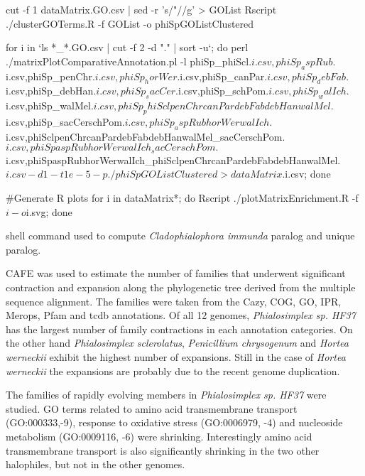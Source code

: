 \documentclass[fontsize=10pt, paper=a4,fleqn, ]{wlscirep}
\newif\ifcode
\newcommand{\TODO}[1]{\textbf{\color{red}{#1}}}
\newcommand{\claImm}{\textit{Cladophialophora immunda}}
\newcommand{\horWer}{\textit{Hortea werneckii}}
\newcommand{\penChr}{\textit{Penicillium chrysogenum}}
\newcommand{\phiSp}{\textit{Phialosimplex sp. HF37}}
\newcommand{\phiScl}{\textit{Phialosimplex sclerolatus}}
\begin{document}
\begin{listing}
{    cut -f 1 dataMatrix.GO.csv | sed -r 's/"//g' > GOList
    Rscript ./clusterGOTerms.R -f GOList -o phiSpGOListClustered

    for i in `ls *_*.GO.csv | cut -f 2 -d "." | sort -u`; do  perl
    ./matrixPlotComparativeAnnotation.pl -l
    phiSp_phiScl.$i.csv,phiSp_aspRub.$i.csv,phiSp_penChr.$i.csv,phiSp_horWer.$i.csv,phiSp_canPar.$i.csv,phiSp_debFab.$i.csv,phiSp_debHan.$i.csv,phiSp_sacCer.$i.csv,phiSp_schPom.$i.csv,phiSp_walIch.$i.csv,phiSp_walMel.$i.csv,phiSp_phiSclpenChrcanPardebFabdebHanwalMel.$i.csv,phiSp_sacCerschPom.$i.csv,phiSp_aspRubhorWerwalIch.$i.csv,phiSclpenChrcanPardebFabdebHanwalMel_sacCerschPom.$i.csv,phiSpaspRubhorWerwalIch_sacCerschPom.$i.csv,phiSpaspRubhorWerwalIch_phiSclpenChrcanPardebFabdebHanwalMel.$i.csv
    -d 1 -t 1e-5 -p ./phiSpGOListClustered > dataMatrix.$i.csv; done 
    
    #Generate R plots
    for i in dataMatrix*; do Rscript ./plotMatrixEnrichment.R -f $i -o $i.svg; done
  }
  \label{code:countTotalParalog}
  \caption{shell command used to compute {\claImm} paralog and unique paralog.}
\end{listing}
\fi


\ifcode
\begin{listing}
  \mint[breaklines,bgcolor=black,formatcom=\color{white},fontsize=\footnotesize]{shell}{
    
  \label{code:AAComparison}
  \caption{Command used to generate the rooted tree}
\end{listing}
\fi

\TODO{AA analysis with correlation analysis, apply correlation
  analysis to eggnog annotation and IPR}

CAFE was used to estimate the number of families that underwent
significant contraction and expansion along the
phylogenetic tree derived from the multiple sequence alignment.
The families were taken from the Cazy, COG, GO, IPR, Merops, Pfam and
tcdb annotations. Of all 12 genomes, {\phiSp} has the largest number of family
contractions in each annotation categories. On the other hand
{\phiScl}, {\penChr} and {\horWer} exhibit the highest number of
expansions. Still in the case of {\horWer} the expansions are probably due
to the recent genome duplication. 

The families of rapidly evolving members in {\phiSp} were studied. GO
terms related to amino acid transmembrane transport (GO:000333,-9),
response to oxidative stress  (GO:0006979, -4) and nucleoside
metabolism (GO:0009116, -6) were shrinking. Interestingly amino acid
transmembrane transport is also significantly shrinking in the two
other halophiles, but not in the other genomes. 
\end{document}
